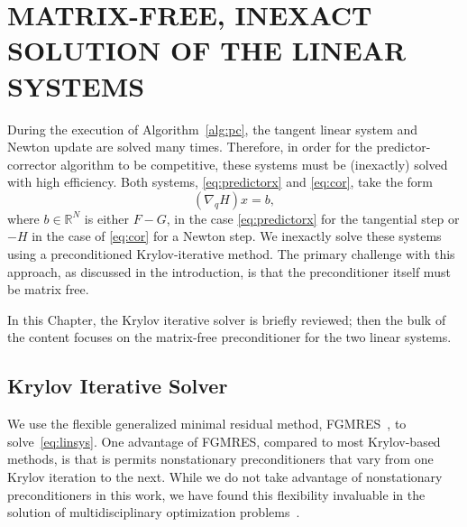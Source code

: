  
\chapter{MATRIX-FREE, INEXACT SOLUTION OF THE LINEAR SYSTEMS}\label{chap:linsys}
During the execution of Algorithm~\ref{alg:pc}, the tangent linear system and
Newton update are solved many times.  Therefore, in order for the
predictor-corrector algorithm to be competitive, these systems must be
(inexactly) solved with high efficiency.  Both systems, \eqref{eq:predictorx}
and \eqref{eq:cor}, take the form
\begin{equation}\label{eq:linsys}
  (\nabla_q H) x = b,
\end{equation}
where $b \in
\mathbb{R}^{N}$ is either $F - G$, in the case \eqref{eq:predictorx} for the tangential step or $-H$ in the case of \eqref{eq:cor} for a Newton step.  We inexactly solve these systems using a preconditioned
Krylov-iterative method.  The primary challenge with this approach, as discussed
in the introduction, is that the preconditioner itself must be matrix free.

In this Chapter, the Krylov iterative solver is briefly reviewed; then the bulk of the content focuses on
the matrix-free preconditioner for the two linear systems. 

\section{Krylov Iterative Solver}
We use the flexible generalized minimal residual method,
FGMRES~\cite{Saad1993fgmres}, to solve~\eqref{eq:linsys}.  One advantage of
FGMRES, compared to most Krylov-based methods, is that is permits nonstationary
preconditioners that vary from one Krylov iteration to the next.  While we do
not take advantage of nonstationary preconditioners in this work, we have found
this flexibility invaluable in the solution of multidisciplinary optimization
problems~\cite{dener:idf2017, dener:2014}.

